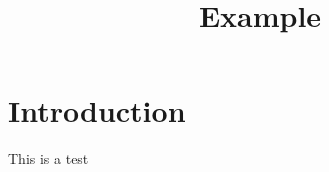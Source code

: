 \documentclass{article}
\title{Example}
\begin{document}
\maketitle

\section{Introduction}
This is a test
\end{document}
